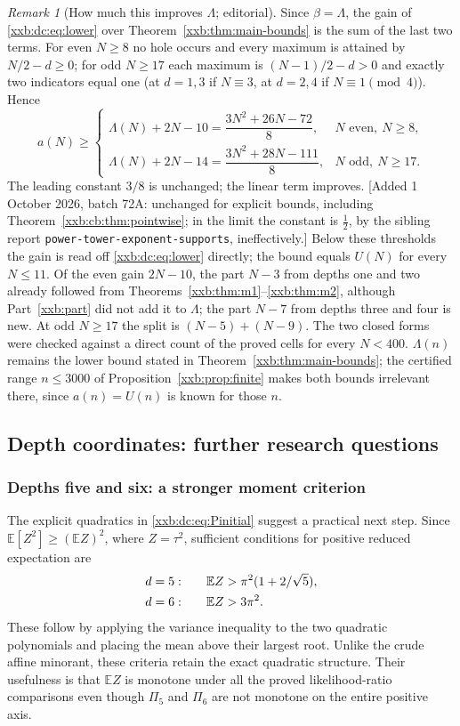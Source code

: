\documentclass[11pt,a4paper]{article}
\numberwithin{equation}{section}
\theoremstyle{definition}
\theoremstyle{remark}
\newtheorem{remark}[theorem]{Remark}
\theoremstyle{plain}
\newcommand{\U}{U}
\newcommand{\sibPTE}{\texttt{power-\allowbreak{}tower-\allowbreak{}exponent-\allowbreak{}supports}}
\begin{document}
\begin{remark}[How much this improves $\Lambda$; editorial]\label{xxb:dc:rem:improve}
Since $\beta=\Lambda$, the gain of \eqref{xxb:dc:eq:lower} over
Theorem~\ref{xxb:thm:main-bounds} is the sum of the last two terms.  For even
$N\ge8$ no hole occurs and every maximum is attained by
$N/2-d\ge0$; for odd $N\ge17$ each maximum is $(N-1)/2-d>0$ and exactly two
indicators equal one (at $d=1,3$ if $N\equiv3$, at $d=2,4$ if $N\equiv1\pmod4$).
Hence
\[
 a(N)\ge
 \begin{cases}
 \Lambda(N)+2N-10=\dfrac{3N^2+26N-72}{8},&N\text{ even},\ N\ge8,\\[8pt]
 \Lambda(N)+2N-14=\dfrac{3N^2+28N-111}{8},&N\text{ odd},\ N\ge17.
 \end{cases}
\]
The leading constant $3/8$ is unchanged; the linear term improves.
[Added 1 October 2026, batch 72A: unchanged for explicit bounds, including
Theorem~\ref{xxb:cb:thm:pointwise}; in the limit the constant is $\tfrac12$, by
the sibling report \sibPTE{}, ineffectively.]  Below these thresholds the gain is read off
\eqref{xxb:dc:eq:lower} directly; the bound equals $\U(N)$ for every $N\le11$.  Of the even gain
$2N-10$, the part $N-3$ from depths one and two already followed from
Theorems~\ref{xxb:thm:m1}--\ref{xxb:thm:m2}, although Part~\ref{xxb:part} did
not add it to $\Lambda$; the part $N-7$ from depths three and four is new.  At
odd $N\ge17$ the split is $(N-5)+(N-9)$.  The two closed forms were checked
against a direct count of the proved cells for every $N<400$.  $\Lambda(n)$
remains the lower bound stated in Theorem~\ref{xxb:thm:main-bounds}; the
certified range $n\le3000$ of Proposition~\ref{xxb:prop:finite} makes both
bounds irrelevant there, since $a(n)=\U(n)$ is known for those $n$.
\end{remark}

\subsection{Depth coordinates: further research questions}\label{xxb:dc:sec:future}

\subsubsection{Depths five and six: a stronger moment criterion}
The explicit quadratics in \eqref{xxb:dc:eq:Pinitial} suggest a practical next
step.  Since $\mathbb E[Z^2]\ge(\mathbb E Z)^2$, where $Z=\tau^2$, sufficient
conditions for positive reduced expectation are
\begin{align}\label{xxb:dc:eq:nextcriteria}
 d=5:&\qquad \mathbb E Z>\pi^2(1+2/\sqrt5),\notag\\
 d=6:&\qquad \mathbb E Z>3\pi^2.
\end{align}
These follow by applying the variance inequality to the two quadratic
polynomials and placing the mean above their largest root.  Unlike the
crude affine minorant, these criteria retain the exact quadratic
structure.  Their usefulness is that $\mathbb E Z$ is monotone under all the
proved likelihood-ratio comparisons even though $\Pi_5$ and $\Pi_6$ are not
monotone on the entire positive axis.
\end{document}
